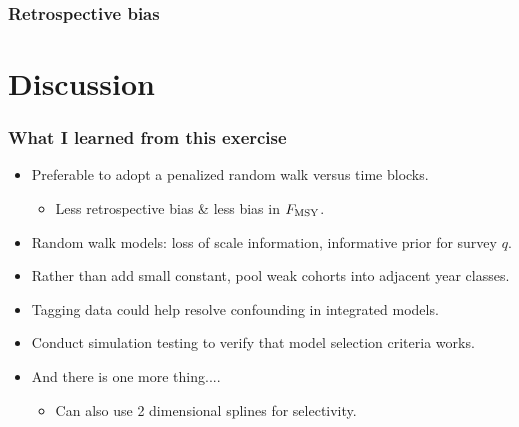 \documentclass{beamer}
\begin{document}
\begin{frame}[m]\frametitle{Retrospective bias}
\end{frame}




\section{Discussion} %
\label{sec:discussion}

\begin{frame}[t]\frametitle{What I learned from this exercise}
    
	\begin{itemize}
		\item<+-> Preferable to adopt a penalized random walk versus time blocks.
			\begin{itemize}
				\item Less retrospective bias \& less bias in $F_{\rm{MSY}}$.
			\end{itemize}
		\item<+-> Random walk models: loss of scale information, informative prior for survey $q$.
		\item<+-> Rather than add small constant, pool weak cohorts into adjacent year classes.
		\item<+-> Tagging data could help resolve confounding in integrated models.
		\item<+-> Conduct simulation testing to verify that model selection criteria works.
		\item<+-> And there is one more thing....
		\begin{itemize}
			\item <+-> Can also use 2 dimensional splines for selectivity.
		\end{itemize}
	\end{itemize}

\end{frame}
\end{document}
